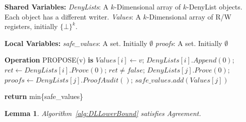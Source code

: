 \documentclass[11pt]{article}
\newtheorem{lemma}{Lemma}
\theoremstyle{definition}
\begin{document}
\begin{algorithm}
    \caption{A $k$-consensus implementation using DenyList objects with $\vert\Pi_M\vert=1$ and $\vert\Pi_V\vert=\vert\Pi_A\vert=k$.}
    \label{alg:DLLowerBound}
    \begin{algorithmic}[1]
    \Statex \textbf{Shared Variables:}
    \Statex \hspace{1em} \textit{DenyLists}: A $k$-Dimensional array of $k$-DenyList objects. Each object has a different writer.
    \Statex \hspace{1em} \textit{Values}: A $k$-Dimensional array of R/W registers, initially $\{\bot\}^k$.

    \Statex
    \Statex \textbf{Local Variables:} \hfill {}
    \Statex \hspace{1em}\textit{safe\_values}: A set. Initially $\emptyset$
    \Statex \hspace{1em}\textit{proofs}: A set. Initially $\emptyset$

    \Statex
    \Statex \textbf{Operation} PROPOSE(v) \textbf{is}
    \State $Values[i] \leftarrow v$;
    \State $DenyLists[i].Append(0)$;
    \Repeat
    \State $ret \leftarrow DenyLists[i].Prove(0)$;
    \Until $ret \neq false$;
        \State $DenyLists[j].Prove(0)$;
    \EndFor
        \State $proofs\leftarrow DenyLists[j].ProofAudit()$;
            \State ${safe\_values}.add(Values[j])$
        \EndIf
    \EndFor

    \State \textbf{return} min\{\mbox{safe\_values}\}
    \end{algorithmic}
\end{algorithm}
\begin{lemma}
  Algorithm~\ref{alg:DLLowerBound} satisfies Agreement.
\end{lemma}
\end{document}
